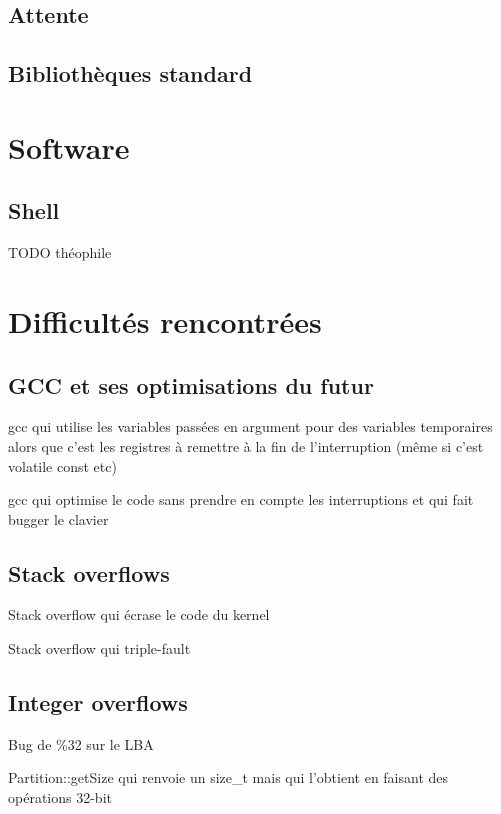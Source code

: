 \documentclass[12pt]{report}
\begin{document}
\section{Attente}

\section{Bibliothèques standard}

\chapter{Software}

\section{Shell}

TODO théophile

\chapter{Difficultés rencontrées}

\section{GCC et ses optimisations du futur}

gcc qui utilise les variables passées en argument pour des variables temporaires alors que c'est les registres à remettre à la fin de l'interruption (même si c'est volatile const etc)

gcc qui optimise le code sans prendre en compte les interruptions et qui fait bugger le clavier

\section{Stack overflows}

Stack overflow qui écrase le code du kernel

Stack overflow qui triple-fault

\section{Integer overflows}

Bug de \%32 sur le LBA

Partition::getSize qui renvoie un size\_t mais qui l'obtient en faisant des opérations 32-bit
\end{document}
